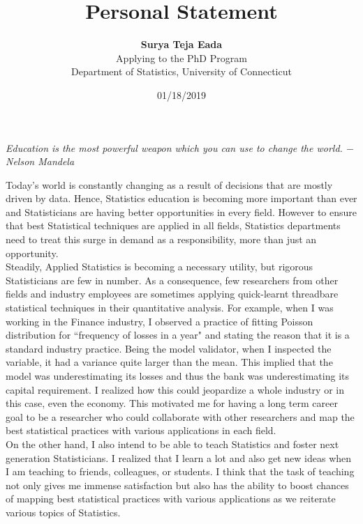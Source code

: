 \documentclass[12pt]{article}
\begin{document}
\title{Personal Statement}
\date{01/18/2019}
\author{{\bf Surya Teja Eada} \\  {\small Applying to the PhD Program } \\ {\small Department of Statistics, University of Connecticut } }

\maketitle

\begin{flushcenter}

{\it Education is the most powerful weapon which you can use to change the world. $-$ Nelson Mandela}
\\
\end{flushcenter}


Today's world is constantly changing as a result of decisions that are mostly driven by data. Hence, Statistics education is becoming more important than ever and Statisticians are having better opportunities in every field. However to ensure that best Statistical techniques are applied in all fields, Statistics departments need to treat this surge in demand as a responsibility, more than just an opportunity. \\

Steadily, Applied Statistics is becoming a necessary utility, but rigorous Statisticians are few in number. As a consequence, few researchers from other fields and industry employees are sometimes applying quick-learnt threadbare statistical techniques in their quantitative analysis. For example, when I was working in the Finance industry, I observed a practice of fitting Poisson distribution for ``frequency of losses in a year" and stating the reason that it is a standard industry practice. Being the model validator, when I inspected the variable, it had a variance quite larger than the mean. This implied that the model was underestimating its losses and thus the bank was underestimating its capital requirement. I realized how this could jeopardize a whole industry or in this case, even the economy. This motivated me for having a long term career goal to be a researcher who could collaborate with other researchers and map the best statistical practices with various applications in each field. \\

On the other hand, I also intend to be able to teach Statistics and foster next generation Statisticians. I realized that I learn a lot and also get new ideas when I am teaching to friends, colleagues, or students. I think that the task of teaching not only gives me immense satisfaction but also has the ability to boost chances of mapping best statistical practices with various applications as we reiterate various topics of Statistics. \\ 
\end{document}
